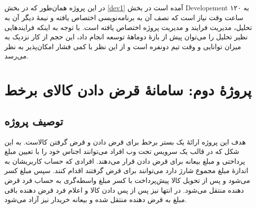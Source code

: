 \documentclass{article}
\begin{document}
\subsection{}

در این پروژه همان‌طور که در بخش \ref{dev1} آمده است در بخش Developement به ۱۲۰ ساعت وقت نیاز است که نصف آن به برنامه‌نویسی اختصاص یافته و نیمهٔ دیگر آن به تحلیل، مدیریت فرایند و مدیریت پروژه اختصاص یافته است. با توجه به اینکه فرایندهایی نظیر تحلیل را می‌توان پیش از بازهٔ دوماههٔ توسعه انجام داد، این حجم از کار نزدیک به میزان توانایی و وقت تیم دونفره است و از این نظر با کمی فشار امکان‌پذیر به نظر می‌رسد.

\section{پروژهٔ دوم: سامانهٔ قرض دادن کالای برخط}

\subsection{توصیف پروژه}

هدف این پروژه ارائهٔ یک بستر برخط برای قرض دادن و قرض گرفتن کالاست. به این شکل که در قالب یک سرویس تحت وب افراد می‌توانند اجناس خود را با تعیین مبلغ پرداختی و مبلغ بیعانه برای قرض دادن قرار می‌دهند. افرادی که حساب کاربریشان به اندازهٔ مبلغ مجموع شارژ دارد می‌توانند برای قرض گرفتند اقدام کنند. سپس مبلغ کسر می‌شود و پس از تحویل کالا پیش‌پرداخت با کسر مبلغ واسطه‌گری به حساب فرد قرض دهنده منتقل می‌شود. در انتها نیز پس از پس دادن کالا و اعلام فرد قرض دهنده باقی مبلغ به قرض دهنده منتقل شده و بیعانه خریدار نیز آزاد می‌شود.

\subsection{}
\end{document}
